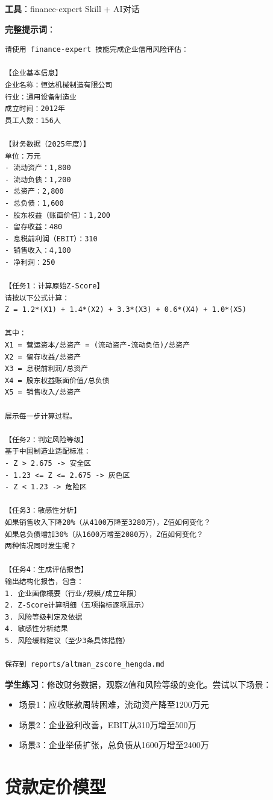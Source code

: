 \begin{practicebox}
\textbf{工具}：finance-expert Skill + AI对话

\textbf{完整提示词}：

\begin{lstlisting}
请使用 finance-expert 技能完成企业信用风险评估：

【企业基本信息】
企业名称：恒达机械制造有限公司
行业：通用设备制造业
成立时间：2012年
员工人数：156人

【财务数据（2025年度）】
单位：万元
- 流动资产：1,800
- 流动负债：1,200
- 总资产：2,800
- 总负债：1,600
- 股东权益（账面价值）：1,200
- 留存收益：480
- 息税前利润（EBIT）：310
- 销售收入：4,100
- 净利润：250

【任务1：计算原始Z-Score】
请按以下公式计算：
Z = 1.2*(X1) + 1.4*(X2) + 3.3*(X3) + 0.6*(X4) + 1.0*(X5)

其中：
X1 = 营运资本/总资产 = (流动资产-流动负债)/总资产
X2 = 留存收益/总资产
X3 = 息税前利润/总资产
X4 = 股东权益账面价值/总负债
X5 = 销售收入/总资产

展示每一步计算过程。

【任务2：判定风险等级】
基于中国制造业适配标准：
- Z > 2.675 -> 安全区
- 1.23 <= Z <= 2.675 -> 灰色区
- Z < 1.23 -> 危险区

【任务3：敏感性分析】
如果销售收入下降20%（从4100万降至3280万），Z值如何变化？
如果总负债增加30%（从1600万增至2080万），Z值如何变化？
两种情况同时发生呢？

【任务4：生成评估报告】
输出结构化报告，包含：
1. 企业画像概要（行业/规模/成立年限）
2. Z-Score计算明细（五项指标逐项展示）
3. 风险等级判定及依据
4. 敏感性分析结果
5. 风险缓释建议（至少3条具体措施）

保存到 reports/altman_zscore_hengda.md
\end{lstlisting}

\textbf{学生练习}：修改财务数据，观察Z值和风险等级的变化。尝试以下场景：
\begin{itemize}[leftmargin=1em]
  \item 场景1：应收账款周转困难，流动资产降至1200万元
  \item 场景2：企业盈利改善，EBIT从310万增至500万
  \item 场景3：企业举债扩张，总负债从1600万增至2400万
\end{itemize}
\end{practicebox}

\section{贷款定价模型}

